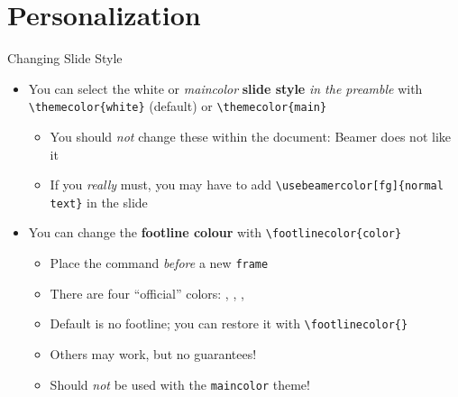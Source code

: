 \section{Personalization}

\begin{frame}[fragile]{Changing Slide Style}
\begin{itemize}
\item You can select the white or \textit{maincolor} \textbf{slide style} \emph{in the 
preamble} with \verb|\themecolor{white}| (default) or \verb|\themecolor{main}|
      \begin{itemize}
      \item You should \emph{not} change these within the document: Beamer does 
      not like it
      \item If you \emph{really} must, you may have to add 
      \verb|\usebeamercolor[fg]{normal text}| in the slide
      \end{itemize}
\item You can change the \textbf{footline colour} with 
\verb|\footlinecolor{color}|
      \begin{itemize}
      \item Place the command \emph{before} a new \verb|frame|
      \item There are four ``official'' colors: 
      , , 
      , 
      \item Default is no footline; you can restore it with 
      \verb|\footlinecolor{}|
      \item Others may work, but no guarantees!
      \item Should \emph{not} be used with the \verb|maincolor| theme!
      \end{itemize}
\end{itemize}
\end{frame}

